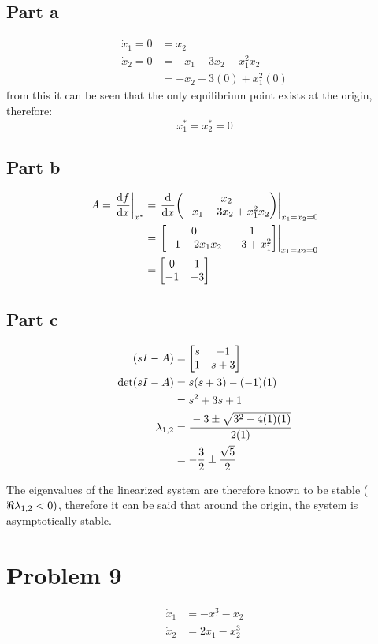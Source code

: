 \documentclass[]{article}
\begin{document}
\subsection{Part a}
\begin{align*}
	\dot{x}_1 = 0 &= x_2\\
	\dot{x}_2 = 0 &= -x_1 - 3 x_2 + x_1^2 x_2\\
	&= -x_2 -3(0) +x_1^2(0)
\end{align*}
from this it can be seen that the only equilibrium point exists at the origin, therefore:
\begin{displaymath}
	x_1^* = x_2^* = 0
\end{displaymath}

\subsection{Part b}
\begin{align*}
	A = \eval{\dv{f}{x}}_{x^*} &= \eval{\dv{x} \mqty(x_2\\ -x_1 - 3 x_2 + x_1^2 x_2)}_{x_1=x_2=0}\\
	&= \eval{\mqty[0 & 1\\ -1 + 2 x_1 x_2 & -3 + x_1^2]}_{x_1=x_2=0}\\
	&= \mqty[0&1\\ -1 & -3]
\end{align*}

\subsection{Part c}
\begin{align*}
	(sI - A)
	&= \mqty[s & -1\\ 1 & s+3]\\
	\det(sI-A)
	&= s (s+3) - (-1)(1)\\
	&= s^2 + 3 s + 1\\
	\lambda_{1,2}
	&= \cfrac{-3 \pm \sqrt{3^2 - 4(1)(1)}}{2(1)}\\
	&= -\frac{3}{2} \pm \frac{\sqrt{5}}{2}
\end{align*}

The eigenvalues of the linearized system are therefore known to be stable ($\real{\lambda_{1,2}} < 0)$, therefore it can be said that around the origin, the system is asymptotically stable.

\newpage
\section{Problem 9}
\begin{align*}
	\dot{x}_1 &= -x_1^3 -x_2\\
	\dot{x}_2 &= 2x_1 -x_2^3
\end{align*}
\end{document}
